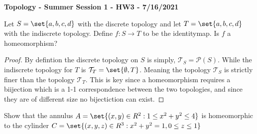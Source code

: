 \documentclass[12pt]{article}
\DeclarePairedDelimiter\set\{\}
\begin{document}
\begin{flushright}
    
    
\end{flushright}
\begin{center}
    {\bf Topology - Summer Session 1 - HW3 - 7/16/2021}
\end{center}

Let $S=\set{a, b, c, d}$ with the discrete topology and let $T=\set{a, b, c, d}$ with the indiscrete topology. Define $f:S\to T$ to be the identitymap. Is $f$ a homeomorphism?
\begin{proof}
    By defintion the discrete topology on $S$ is simply, $\mathcal{T}_S = \mathcal{P}(S) $. While the indiscrete topology for $T$ is $\mathcal{T}_T = \set{\emptyset, T}$. Meaning the topology $\mathcal{T}_S$ is strictly finer than the topology $\mathcal{T}_T$. This is key since a homeomorphism requires a biijection which is a 1-1 correspondence between the two topologies, and since they are of different size no bijectiction can exist. 
\end{proof}

\vspace*{1.5cm}

 Show that the annulus $A=\set{(x, y)\in R^2:1\leq x^2+y^2\leq 4}$ is homeomorphic to the cylinder $C=\set{(x, y, z)\in R^3:x^2+y^2=1,0
\leq z\leq 1}$





\end{document}
